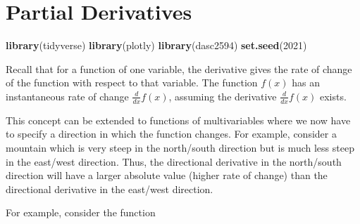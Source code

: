 \documentclass[
]{book}
\newenvironment{Shaded}{\begin{snugshade}}{\end{snugshade}}
\newcommand{\ControlFlowTok}[1]{\textcolor[rgb]{0.13,0.29,0.53}{\textbf{#1}}}
\newcommand{\DataTypeTok}[1]{\textcolor[rgb]{0.13,0.29,0.53}{#1}}
\newcommand{\DecValTok}[1]{\textcolor[rgb]{0.00,0.00,0.81}{#1}}
\newcommand{\KeywordTok}[1]{\textcolor[rgb]{0.13,0.29,0.53}{\textbf{#1}}}
\newcommand{\NormalTok}[1]{#1}
\newcommand{\OperatorTok}[1]{\textcolor[rgb]{0.81,0.36,0.00}{\textbf{#1}}}
\newcommand{\StringTok}[1]{\textcolor[rgb]{0.31,0.60,0.02}{#1}}
\theoremstyle{definition}
\theoremstyle{definition}
\theoremstyle{definition}
\theoremstyle{definition}
\theoremstyle{remark}
\begin{document}
\hypertarget{partial-derivatives}{%
\chapter{Partial Derivatives}\label{partial-derivatives}}

\begin{Shaded}
\begin{Highlighting}[]
\KeywordTok{library}\NormalTok{(tidyverse)}
\KeywordTok{library}\NormalTok{(plotly)}
\KeywordTok{library}\NormalTok{(dasc2594)}
\KeywordTok{set.seed}\NormalTok{(}\DecValTok{2021}\NormalTok{)}
\end{Highlighting}
\end{Shaded}

Recall that for a function of one variable, the derivative gives the rate of change of the function with respect to that variable. The function \(f(x)\) has an instantaneous rate of change \(\frac{d}{dx}f(x)\), assuming the derivative \(\frac{d}{dx}f(x)\) exists.

This concept can be extended to functions of multivariables where we now have to specify a direction in which the function changes. For example, consider a mountain which is very steep in the north/south direction but is much less steep in the east/west direction. Thus, the directional derivative in the north/south direction will have a larger absolute value (higher rate of change) than the directional derivative in the east/west direction.

For example, consider the function

\begin{Shaded}
\end{Shaded}
\end{document}
